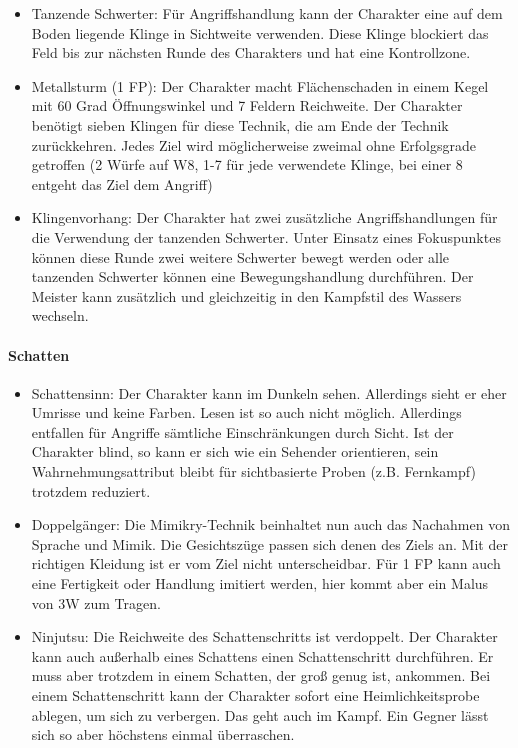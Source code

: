 \documentclass{article}
\begin{document}
\begin{itemize}
\item Tanzende Schwerter: Für Angriffshandlung kann der Charakter eine auf dem Boden liegende Klinge in Sichtweite verwenden. Diese Klinge blockiert das Feld bis zur nächsten Runde des Charakters und hat eine Kontrollzone.
\item Metallsturm (1 FP): Der Charakter macht Flächenschaden in einem Kegel mit 60 Grad Öffnungswinkel und 7 Feldern Reichweite. Der Charakter benötigt sieben Klingen für diese Technik, die am Ende der Technik zurückkehren. Jedes Ziel wird möglicherweise zweimal ohne Erfolgsgrade getroffen (2 Würfe auf W8, 1-7 für jede verwendete Klinge, bei einer 8 entgeht das Ziel dem Angriff)
\item Klingenvorhang: Der Charakter hat zwei zusätzliche Angriffshandlungen für die Verwendung der tanzenden Schwerter. Unter Einsatz eines Fokuspunktes können diese Runde zwei weitere Schwerter bewegt werden oder alle tanzenden Schwerter können eine Bewegungshandlung durchführen. Der Meister kann zusätzlich und gleichzeitig in den Kampfstil des Wassers wechseln.
\end{itemize}

\paragraph{Schatten}

\begin{itemize}
\item Schattensinn: Der Charakter kann im Dunkeln sehen. Allerdings sieht er eher Umrisse und keine Farben. Lesen ist so auch nicht möglich. Allerdings entfallen für Angriffe sämtliche Einschränkungen durch Sicht. Ist der Charakter blind, so kann er sich wie ein Sehender orientieren, sein Wahrnehmungsattribut bleibt für sichtbasierte Proben (z.B. Fernkampf) trotzdem reduziert.
\item Doppelgänger: Die Mimikry-Technik beinhaltet nun auch das Nachahmen von Sprache und Mimik. Die Gesichtszüge passen sich denen des Ziels an. Mit der richtigen Kleidung ist er vom Ziel nicht unterscheidbar. Für 1 FP kann auch eine Fertigkeit oder Handlung imitiert werden, hier kommt aber ein Malus von 3W zum Tragen.
\item Ninjutsu: Die Reichweite des Schattenschritts ist verdoppelt. Der Charakter kann auch außerhalb eines Schattens einen Schattenschritt durchführen. Er muss aber trotzdem in einem Schatten, der groß genug ist, ankommen. Bei einem Schattenschritt kann der Charakter sofort eine Heimlichkeitsprobe ablegen, um sich zu verbergen. Das geht auch im Kampf. Ein Gegner lässt sich so aber höchstens einmal überraschen.
\end{itemize}
\end{document}
